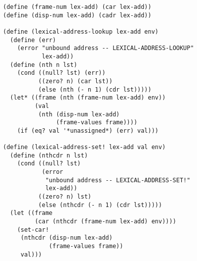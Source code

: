 \documentclass[a4paper,12pt]{article}
\begin{document}
\begin{lstlisting}
(define (frame-num lex-add) (car lex-add))
(define (disp-num lex-add) (cadr lex-add))

(define (lexical-address-lookup lex-add env)
  (define (err)
    (error "unbound address -- LEXICAL-ADDRESS-LOOKUP"
           lex-add))
  (define (nth n lst)
    (cond ((null? lst) (err))
          ((zero? n) (car lst))
          (else (nth (- n 1) (cdr lst)))))
  (let* ((frame (nth (frame-num lex-add) env))
         (val
          (nth (disp-num lex-add)
               (frame-values frame))))
    (if (eq? val '*unassigned*) (err) val)))

(define (lexical-address-set! lex-add val env)
  (define (nthcdr n lst)
    (cond ((null? lst)
           (error
            "unbound address -- LEXICAL-ADDRESS-SET!"
            lex-add))
          ((zero? n) lst)
          (else (nthcdr (- n 1) (cdr lst)))))
  (let ((frame
         (car (nthcdr (frame-num lex-add) env))))
    (set-car!
     (nthcdr (disp-num lex-add)
             (frame-values frame))
     val)))
\end{lstlisting}
\end{document}
